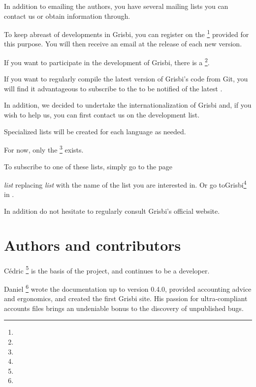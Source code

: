 In addition to emailing the authors, you have several mailing lists you can contact us or obtain information through.

To keep abreast of developments in Grisbi, you can register on the  \footnote{ \urlListInfoEmail{}} provided for this purpose.  You will then receive an email at the release of each new version.

If you want to participate in the development of Grisbi, there is a  \footnote{ \urlListDevelEmail{}}.

If you want to regularly compile the latest version of Grisbi's code from \gls{Git}, you will find it advantageous to subscribe to the  to be notified of the latest .

In addition, we decided to undertake the internationalization of Grisbi and, if you wish to help us, you can first contact us on the development list.

Specialized lists will be created for each language as needed.

For now, only the  \footnote{ \urlListAnglaiseEmail{}} exists.

To subscribe to one of these lists, simply go to the page

\urlListSF{} \emph{list} replacing \emph{list} with the name of the list you are interested in. Or go to{Grisbi}\footnote{ \urlGrisbi{}} in .

In addition do not hesitate to regularly consult Grisbi's official website.


\newpage

\section{Authors and contributors\label{introduction-authors}}

{Cédric } \footnote{ \urlCedricAugerEmail{}} is the basis of the project, and continues to be a developer.

{Daniel } \footnote{ \urlDanielCartronEmail{}} wrote the documentation up to version 0.4.0, provided accounting advice and ergonomics, and created the first Grisbi site. His passion for ultra-compliant accounts files brings an undeniable bonus to the discovery of unpublished bugs.

